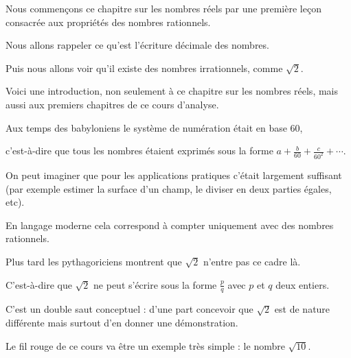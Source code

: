 







\debuttexte


\diapo

\change

Nous commençons ce chapitre sur les nombres réels par 
une première leçon consacrée aux propriétés des nombres rationnels.

\change

Nous allons rappeler ce qu'est l'écriture décimale des nombres.

\change

Puis nous allons voir qu'il existe des nombres irrationnels, comme $\sqrt{2}$.


\diapo

Voici une introduction, non seulement à ce chapitre sur les nombres réels,
mais aussi aux premiers chapitres de ce cours d'analyse.

Aux temps des babyloniens le système de numération était en base $60$, 

\change

c'est-à-dire que tous 
les nombres étaient exprimés sous la forme $a+\frac{b}{60} + \frac{c}{60^2}+ \cdots$.


On peut imaginer que pour les applications pratiques c'était largement suffisant (par exemple
estimer la surface d'un champ, le diviser en deux parties égales, etc).

En langage moderne cela correspond à compter uniquement avec des nombres rationnels.

\change

Plus tard les pythagoriciens montrent que $\sqrt 2$ n'entre pas ce cadre là.

\change

C'est-à-dire que $\sqrt2$ ne peut s'écrire sous la forme $\frac pq$ avec $p$ et $q$ deux entiers.

C'est un double saut conceptuel : d'une part concevoir que $\sqrt 2$ est de nature différente 
mais surtout d'en donner une démonstration.

\change

Le fil rouge de ce cours va être un exemple très simple : le nombre $\sqrt{10}$.

